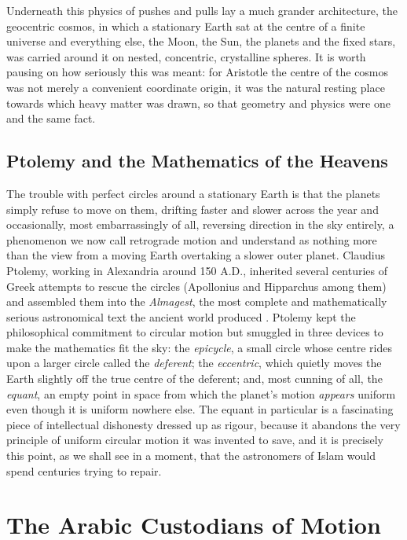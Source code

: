     Underneath this physics of pushes and pulls lay a much grander architecture, the geocentric cosmos, in which a stationary Earth sat at the centre of a finite universe and everything else, the Moon, the Sun, the planets and the fixed stars, was carried around it on nested, concentric, crystalline spheres. It is worth pausing on how seriously this was meant: for Aristotle the centre of the cosmos was not merely a convenient coordinate origin, it was the natural resting place towards which heavy matter was drawn, so that geometry and physics were one and the same fact.

    \subsection{Ptolemy and the Mathematics of the Heavens}

    The trouble with perfect circles around a stationary Earth is that the planets simply refuse to move on them, drifting faster and slower across the year and occasionally, most embarrassingly of all, reversing direction in the sky entirely, a phenomenon we now call retrograde motion and understand as nothing more than the view from a moving Earth overtaking a slower outer planet. Claudius Ptolemy, working in Alexandria around 150 A.D., inherited several centuries of Greek attempts to rescue the circles (Apollonius and Hipparchus among them) and assembled them into the \textit{Almagest}, the most complete and mathematically serious astronomical text the ancient world produced \citep{ptolemy_almagest}. Ptolemy kept the philosophical commitment to circular motion but smuggled in three devices to make the mathematics fit the sky: the \textit{epicycle}, a small circle whose centre rides upon a larger circle called the \textit{deferent}; the \textit{eccentric}, which quietly moves the Earth slightly off the true centre of the deferent; and, most cunning of all, the \textit{equant}, an empty point in space from which the planet's motion \textit{appears} uniform even though it is uniform nowhere else. The equant in particular is a fascinating piece of intellectual dishonesty dressed up as rigour, because it abandons the very principle of uniform circular motion it was invented to save, and it is precisely this point, as we shall see in a moment, that the astronomers of Islam would spend centuries trying to repair.

\section{The Arabic Custodians of Motion}

